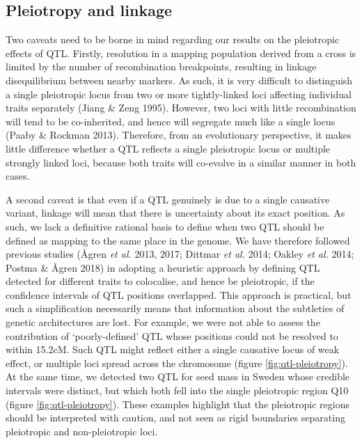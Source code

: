 \documentclass[12pt,]{article}
\begin{document}
\hypertarget{pleiotropy-and-linkage}{%
\subsection{Pleiotropy and linkage}\label{pleiotropy-and-linkage}}

Two caveats need to be borne in mind regarding our results on the pleiotropic effects of QTL.
Firstly, resolution in a mapping population derived from a cross is limited by the number of recombination breakpoints, resulting in linkage disequilibrium between nearby markers.
As such, it is very difficult to distinguish a single pleiotropic locus from two or more tightly-linked loci affecting individual traits separately (Jiang \& Zeng 1995).
However, two loci with little recombination will tend to be co-inherited, and hence will segregate much like a single locus (Paaby \& Rockman 2013).
Therefore, from an evolutionary perspective, it makes little difference whether a QTL reflects a single pleiotropic locus or multiple strongly linked loci, because both traits will co-evolve in a similar manner in both cases.

A second caveat is that even if a QTL genuinely is due to a single causative variant, linkage will mean that there is uncertainty about its exact position.
As such, we lack a definitive rational basis to define when two QTL should be defined as mapping to the same place in the genome.
We have therefore followed previous studies (Ågren \emph{et al.} 2013, 2017; Dittmar \emph{et al.} 2014; Oakley \emph{et al.} 2014; Postma \& Ågren 2018) in adopting a heuristic approach by defining QTL detected for different traits to colocalise, and hence be pleiotropic, if the confidence intervals of QTL positions overlapped.
This approach is practical, but such a simplification necessarily means that information about the subtleties of genetic architectures are lost.
For example, we were not able to assess the contribution of `poorly-defined' QTL whose positions could not be resolved to within 15.2cM.
Such QTL might reflect either a single causative locus of weak effect, or multiple loci spread across the chromosome (figure \ref{fig:qtl-pleiotropy}).
At the same time, we detected two QTL for seed mass in Sweden whose credible intervals were distinct, but which both fell into the single pleiotropic region Q10 (figure \ref{fig:qtl-pleiotropy}).
These examples highlight that the pleiotropic regions should be interpreted with caution, and not seen as rigid boundaries separating pleiotropic and non-pleiotropic loci.
\end{document}
